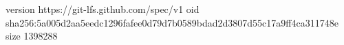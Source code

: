 version https://git-lfs.github.com/spec/v1
oid sha256:5a005d2aa5eedc1296fafee0d79d7b0589bdad2d3807d55c17a9ff4ca311748e
size 1398288
